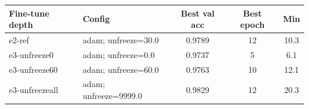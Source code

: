 \begin{tabular}{llccc}
\toprule
Fine-tune depth & Config & Best val acc & Best epoch & Min \\
\midrule
e2-ref & adam; unfreeze=30.0 & 0.9789 & 12 & 10.3\\
e3-unfreeze0 & adam; unfreeze=0.0 & 0.9737 & 5 & 6.1\\
e3-unfreeze60 & adam; unfreeze=60.0 & 0.9763 & 10 & 12.1\\
e3-unfreezeall & adam; unfreeze=9999.0 & 0.9829 & 12 & 20.3 \\
\bottomrule
\end{tabular}
